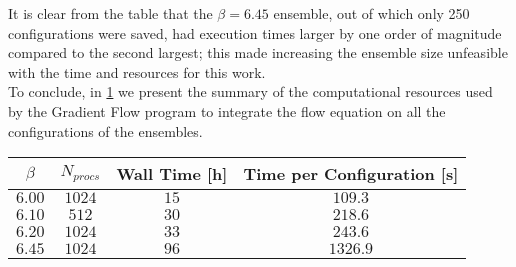 It is clear from the table that the $\beta=6.45$ ensemble, out of which only 250 configurations were saved, had execution times larger by one order of magnitude compared to the second largest; this made increasing the ensemble size unfeasible with the time and resources for this work.\\
To conclude, in \cref{runs:times_flow} we present the summary of the computational resources used by the Gradient Flow program to integrate the flow equation on all the configurations of the ensembles.

\begin{table}[!htb]
    \begin{center}
    \begin{tabular}{cccc}
        $\beta$ & $N_{procs}$ & Wall Time [h] & Time per Configuration [s]\\\hline
        $6.00$ & $1024$ & $15$ & $109.3$\\
        $6.10$ & $512$ & $30$ & $218.6$\\
        $6.20$ & $1024$ & $33$ & $243.6$ \\
        $6.45$ & $1024$ & $96$ & $1326.9$
    \end{tabular}
    \label{runs:times_flow} 
    \end{center}
\end{table}